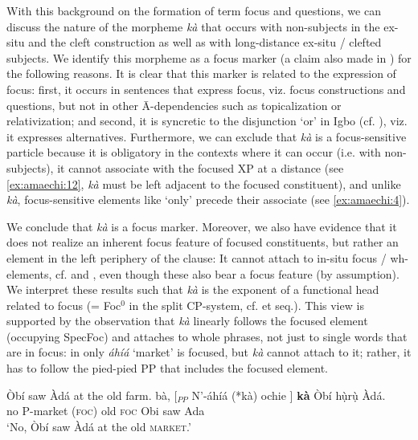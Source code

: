 \documentclass[output=paper,colorlinks,citecolor=brown]{langscibook}
\begin{document}
With this background on the formation of term focus and questions, we can discuss the nature of the morpheme \textit{k\`a} that occurs with non-subjects in the ex-situ and the cleft construction as well as with long-distance ex-situ / clefted subjects. We identify this morpheme as a focus marker (a claim also  made in \citealt{Osuagwu2015}) for the following reasons. It is clear that this marker is related to the expression of focus: first, it occurs in sentences that express focus, viz. focus constructions and questions, but not in other \=A-dependencies such as topicalization or relativization; and second, it is syncretic to the disjunction `or' in Igbo (cf. \citealt{Nwachukwu1987}), viz. it expresses alternatives. Furthermore, we can exclude that \textit{k\`a} is a focus-sensitive particle because it is obligatory in the contexts where it can occur (i.e. with non-subjects), it cannot associate with the focused XP at a distance (see \ref{ex:amaechi:12}, \textit{k\`a} must be left adjacent to the focused constituent), and unlike \textit{k\`a}, focus-sensitive elements like `only' precede their associate (see \ref{ex:amaechi:4}).

\z

We conclude that \textit{k\`a} is a focus marker. Moreover, we also have evidence that it does not realize an inherent focus feature of focused constituents, but rather an element in the left periphery of the clause:  It  cannot attach to in-situ focus / wh-elements, cf.  and , even though these also bear a focus feature (by assumption). We interpret these results such that \textit{k\`a} is the exponent of a functional head related to focus (= Foc$^{0}$ in the split CP-system, cf. \citealt{Rizzi1997} et seq.). This view is supported by the observation that \textit{k\`a} linearly follows the focused element (occupying SpecFoc) and attaches to whole phrases, not just to single words that are in focus: in  only \textit{áhíá} `market' is focused, but \textit{k\`a} cannot  attach to it; rather, it has to follow the pied-pied PP that includes the focused element.

\ea%
    \label{ex:amaechi:13}
    \ea\label{ex:amaechi:13a}
        Òbí saw Àdá at the old farm.
    \ex\label{ex:amaechi:13b}
        bà, [$_{PP}$ N'-áhíá (*kà) ochie ] \textbf{kà} {} Òbí hụ̀rụ̀ Àdá.\\
                no {} P-market (\textsc{foc}) old {} \textsc{foc} {} Obi saw Ada\\
        \glt    `No, Òbí saw Àdá at the {old} \textsc{market}.'%
    \z
\z
\end{document}
